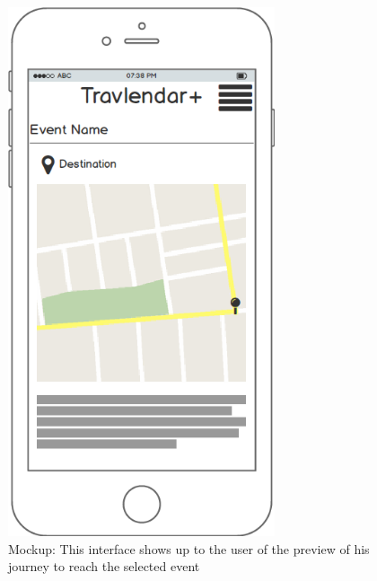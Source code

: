 \documentclass[numbers=noenddot, 12pt, a4paper, oneside]{scrbook}
\begin{document}
\begin{figure}[H]
	\centering
	\includegraphics[width=0.7\textwidth]{mockups/Guide}
	\caption{Mockup: This interface shows up to the user of the preview of his journey to reach the selected event}
\end{figure}
\end{document}
